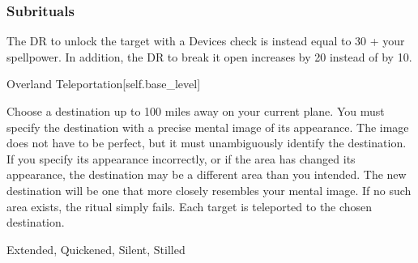 \subsubsection{Subrituals}
The DR to unlock the target with a Devices check is instead equal to 30 + your spellpower.
In addition, the DR to break it open increases by 20 instead of by 10.
\begin{spellsection}{Overland Teleportation}[self.base_level]
\begin{spellcontent}
\begin{spelltargetinginfo}
\end{spelltargetinginfo}
\begin{spelleffects}
\spellspecial
Choose a destination up to 100 miles away on your current plane.
You must specify the destination with a precise mental image of its appearance.
The image does not have to be perfect, but it must unambiguously identify the destination.
If you specify its appearance incorrectly, or if the area has changed its appearance, the destination may be a different area than you intended.
The new destination will be one that more closely resembles your mental image.
If no such area exists, the ritual simply fails.
\spelleffect
Each target is teleported to the chosen destination.
\end{spelleffects}
\end{spellcontent}
\begin{spellfooter}
 Extended, Quickened, Silent, Stilled
\end{spellfooter}
\begin{spellsubcontent}
\end{spellsubcontent}
\end{spellsection}
